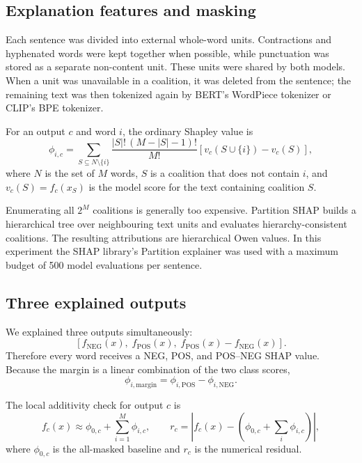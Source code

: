 \documentclass[11pt,a4paper]{article}
\begin{document}
\subsection{Explanation features and masking}

Each sentence was divided into external whole-word units. Contractions and hyphenated words were kept together when possible, while punctuation was stored as a separate non-content unit. These units were shared by both models. When a unit was unavailable in a coalition, it was deleted from the sentence; the remaining text was then tokenized again by BERT's WordPiece tokenizer or CLIP's BPE tokenizer.

For an output $c$ and word $i$, the ordinary Shapley value is
\begin{equation}
\phi_{i,c}=
\sum_{S\subseteq N\setminus\{i\}}
\frac{|S|!\,(M-|S|-1)!}{M!}
\left[v_c(S\cup\{i\})-v_c(S)\right],
\end{equation}
where $N$ is the set of $M$ words, $S$ is a coalition that does not contain $i$, and $v_c(S)=f_c(x_S)$ is the model score for the text containing coalition $S$.

Enumerating all $2^M$ coalitions is generally too expensive. Partition SHAP builds a hierarchical tree over neighbouring text units and evaluates hierarchy-consistent coalitions. The resulting attributions are hierarchical Owen values. In this experiment the SHAP library's Partition explainer was used with a maximum budget of 500 model evaluations per sentence.

\subsection{Three explained outputs}

We explained three outputs simultaneously:
\begin{equation}
  \left[f_{\mathrm{NEG}}(x),\;f_{\mathrm{POS}}(x),\;f_{\mathrm{POS}}(x)-f_{\mathrm{NEG}}(x)\right].
\end{equation}
Therefore every word receives a NEG, POS, and POS--NEG SHAP value. Because the margin is a linear combination of the two class scores,
\begin{equation}
  \phi_{i,\mathrm{margin}}=\phi_{i,\mathrm{POS}}-\phi_{i,\mathrm{NEG}}.
\end{equation}

The local additivity check for output $c$ is
\begin{equation}
  f_c(x)\approx \phi_{0,c}+\sum_{i=1}^{M}\phi_{i,c},
  \qquad
  r_c=\left|f_c(x)-\left(\phi_{0,c}+\sum_i\phi_{i,c}\right)\right|,
\end{equation}
where $\phi_{0,c}$ is the all-masked baseline and $r_c$ is the numerical residual.
\end{document}
